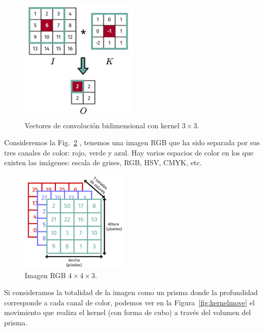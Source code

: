 \documentclass[a4paper,12pt]{article}
\begin{document}
\begin{figure}[H]
	\begin{center}				
		\includegraphics[width=0.5\textwidth]{convolution2d.png}
		\caption{Vectores de convolución bidimensional con kernel $3 \times 3$.}
		\label{fig:conv2d}
	\end{center}
\end{figure}

Consideremos la Fig.~\ref{fig:conv2dimg} \citep{Saha2020Oct}, tenemos una imagen RGB que ha sido separada por sus tres canales de color: rojo, verde y azul. Hay varios espacios de color en los que existen las imágenes: escala de grises, RGB, HSV, CMYK, etc.

\begin{figure}[H]
	\begin{center}				
		\includegraphics[width=0.45\textwidth]{imgrgb.png}
		\caption{Imagen RGB $4 \times 4 \times 3$.}
		\label{fig:conv2dimg}
	\end{center}
\end{figure}

\clearpage

Si consideramos la totalidad de la imagen como un prisma donde la profundidad corresponde a cada canal de color, podemos ver en la Figura~\ref{fig:kernelmove} el movimiento que realiza el kernel (con forma de cubo) a través del volumen del prisma.
\end{document}
